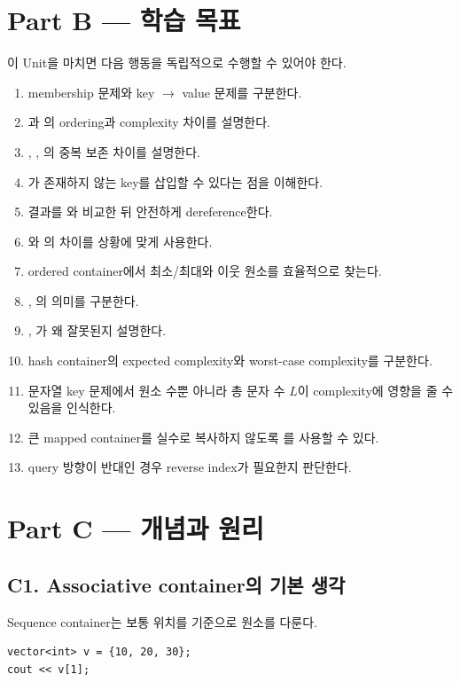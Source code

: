 \section{Part B --- 학습 목표}
이 Unit을 마치면 다음 행동을 독립적으로 수행할 수 있어야 한다.
\begin{enumerate}
\item membership 문제와 key $\to$ value 문제를 구분한다.
\item {}과 의 ordering과 complexity 차이를 설명한다.
\item {}, , 의 중복 보존 차이를 설명한다.
\item {}가 존재하지 않는 key를 삽입할 수 있다는 점을 이해한다.
\item {} 결과를 와 비교한 뒤 안전하게 dereference한다.
\item {}와 의 차이를 상황에 맞게 사용한다.
\item ordered container에서 최소/최대와 이웃 원소를 효율적으로 찾는다.
\item {}, 의 의미를 구분한다.
\item {}, 가 왜 잘못된지 설명한다.
\item hash container의 expected complexity와 worst-case complexity를 구분한다.
\item 문자열 key 문제에서 원소 수뿐 아니라 총 문자 수 $L$이 complexity에 영향을 줄 수 있음을 인식한다.
\item 큰 mapped container를 실수로 복사하지 않도록 를 사용할 수 있다.
\item query 방향이 반대인 경우 reverse index가 필요한지 판단한다.
\end{enumerate}

\section{Part C --- 개념과 원리}

\subsection{C1. Associative container의 기본 생각}
Sequence container는 보통 위치를 기준으로 원소를 다룬다.
\begin{lstlisting}
vector<int> v = {10, 20, 30};
cout << v[1];
\end{lstlisting}

